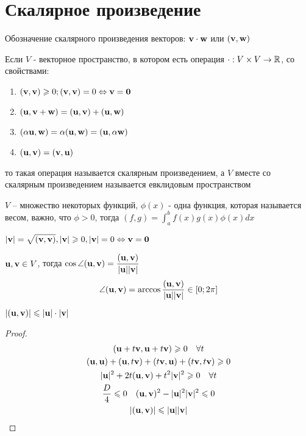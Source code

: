 \documentclass[main]{subfiles}
\begin{document}
\chapter{Скалярное произведение}
Обозначение скалярного произведения векторов: $\mathbf{v} \cdot \mathbf{w}$ или $(\mathbf{v}, \mathbf{w})$

\begin{definition}
    Если $V$ - векторное пространство, в котором есть операция $\cdot : V \times V
        \rightarrow \mathbb{R}$, со свойствами:
    \begin{enumerate}
        \item $(\mathbf{v}, \mathbf{v}) \geqslant0; (\mathbf{v}, \mathbf{v}) = 0 \Leftrightarrow \mathbf{v} = \mathbf{0}$
        \item $(\mathbf{u}, \mathbf{v}+ \mathbf{w}) = (\mathbf{u},\mathbf{v})+ (\mathbf{u},\mathbf{w})$
        \item $(\alpha\mathbf{u}, \mathbf{w}) = \alpha(\mathbf{u}, \mathbf{w}) = (\mathbf{u}, \alpha \mathbf{w})$
        \item $(\mathbf{u},\mathbf{v}) = (\mathbf{v},\mathbf{u})$
    \end{enumerate}
    то такая операция называется скалярным произведением, а $V$ вместе
    со скалярным произведением называется евклидовым пространством
\end{definition}

\begin{example}
    $V$ -- множество некоторых функций, $\phi(x)$ - одна функция, которая
    называется весом, важно, что $\phi >0$, тогда $(f,g) = \int_a^b f(x)g(x)\phi(x)dx$
\end{example}

\begin{definition}
    $|\mathbf{v}| = \sqrt{(\mathbf{v}, \mathbf{v})}, |\mathbf{v}| \geqslant 0, |\mathbf{v}| = 0 \Leftrightarrow \mathbf{v} = \mathbf{0}$
\end{definition}
\begin{definition}
    $\mathbf{u}, \mathbf{v} \in V$, тогда
    $\displaystyle \cos \angle (\mathbf{u}, \mathbf{v}) = \frac{(\mathbf{u},\mathbf{v})}{|\mathbf{u}||\mathbf{v}|}$
    \[\angle(\mathbf{u}, \mathbf{v}) = \arccos \frac{(\mathbf{u},\mathbf{v})}{|\mathbf{u}||\mathbf{v}|} \in [0; 2\pi]\]
\end{definition}

\begin{theorem}
    $|(\mathbf{u},\mathbf{v})| \leqslant |\mathbf{u}| \cdot |\mathbf{v}|$
\end{theorem}
\begin{proof}
    \begin{gather*}
        (\mathbf{u} + t \mathbf{v}, \mathbf{u}+t \mathbf{v}) \geqslant 0 \quad \forall t\\
        (\mathbf{u}, \mathbf{u}) + (\mathbf{u},t \mathbf{v})+(t \mathbf{v}, \mathbf{u}) + (t \mathbf{v}, t \mathbf{v}) \geqslant 0\\
        |\mathbf{u}|^2 + 2t(\mathbf{u},\mathbf{v}) + t^2 |\mathbf{v}|^2 \geqslant 0 \quad \forall t\\
        \frac{D}{4} \leqslant 0 \quad (\mathbf{u},\mathbf{v})^2 - |\mathbf{u}|^2 |\mathbf{v}|^2 \leqslant 0\\
        |(\mathbf{u},\mathbf{v})| \leqslant |\mathbf{u}| |\mathbf{v}|
    \end{gather*}
\end{proof}
\end{document}
